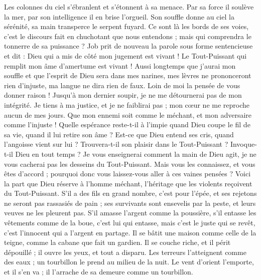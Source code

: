 \begin{multicols}{2}
Les colonnes du ciel s'ébranlent et s'étonnent à sa menace.
Par sa force il soulève la mer, par son intelligence il en brise l'orgueil.
Son souffle donne au ciel la sérénité, sa main transperce le serpent fuyard.
Ce sont là les bords de ses voies, c'est le discours fait en chuchotant que nous entendons ; mais qui comprendra le tonnerre de sa puissance ?
\VerseOne{}Job prit de nouveau la parole sous forme sentencieuse et dit :
Dieu qui a mis de côté mon jugement est vivant ! Le Tout-Puissant qui remplit mon âme d'amertume est vivant !
Aussi longtemps que j'aurai mon souffle et que l'esprit de Dieu sera dans mes narines,
mes lèvres ne prononceront rien d'injuste, ma langue ne dira rien de faux.
Loin de moi la pensée de vous donner raison ! Jusqu'à mon dernier soupir, je ne me détournerai pas de mon intégrité.
Je tiens à ma justice, et je ne faiblirai pas ; mon cœur ne me reproche aucun de mes jours.
Que mon ennemi soit comme le méchant, et mon adversaire comme l'injuste !
Quelle espérance reste-t-il à l'impie quand Dieu coupe le fil de sa vie, quand il lui retire son âme ?
Est-ce que Dieu entend ses cris, quand l'angoisse vient sur lui ?
Trouvera-t-il son plaisir dans le Tout-Puissant ? Invoque-t-il Dieu en tout temps ?
Je vous enseignerai comment la main de Dieu agit, je ne vous cacherai pas les desseins du Tout-Puissant.
Mais vous les connaissez, et vous êtes d'accord ; pourquoi donc vous laissez-vous aller à ces vaines pensées ?
Voici la part que Dieu réserve à l'homme méchant, l'héritage que les violents reçoivent du Tout-Puissant.
S'il a des fils en grand nombre, c'est pour l'épée, et ses rejetons ne seront pas rassasiés de pain ;
ses survivants sont ensevelis par la peste, et leurs veuves ne les pleurent pas.
S'il amasse l'argent comme la poussière, s'il entasse les vêtements comme de la boue,
c'est lui qui entasse, mais c'est le juste qui se revêt, c'est l'innocent qui a l'argent en partage.
Il se bâtit une maison comme celle de la teigne, comme la cabane que fait un gardien.
Il se couche riche, et il périt dépouillé ; il ouvre les yeux, et tout a disparu.
Les terreurs l'atteignent comme des eaux ; un tourbillon le prend au milieu de la nuit.
Le vent d'orient l'emporte, et il s'en va ; il l'arrache de sa demeure comme un tourbillon.

\end{multicols}

